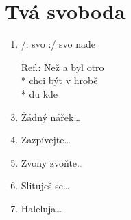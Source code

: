\section{Tvá svoboda}
\begin{enumerate}
\item /:  svo :/  svo nade   
\item[Ref.:] Než a byl otro \\*
chci být  v hrobě  \\*
du  kde     
\item Žádný nářek… 
\item Zazpívejte… 
\item Zvony zvoňte… 
\item Slituješ se… 
\item Haleluja…
\end{enumerate}
